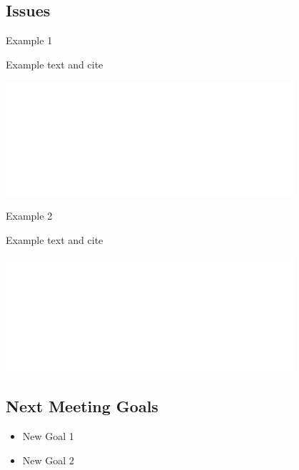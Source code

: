 \subsection{Issues}
\begin{frame}{Example 1}
	\begin{minipage}{0.5\textwidth}
		Example text and cite \cite{article}
	\end{minipage}%
	\colorbox{blue!20}{\begin{minipage}{0.5\textwidth}
			\includegraphics[width=0.8\textwidth]{_Example/Images/tud_white.pdf}   
	\end{minipage}}
\end{frame}

\begin{frame}{Example 2}
	\begin{minipage}{0.5\textwidth}
		Example text and cite \cite{article}
	\end{minipage}%
	\colorbox{red!20}{\begin{minipage}{0.5\textwidth}
			\includegraphics[width=0.8\textwidth]{_Example/Images/tud_white.pdf}   
	\end{minipage}}
\end{frame}



\subsection{Next Meeting Goals}
\begin{frame}{}
\centering
\begin{minipage}{0.6\textwidth}
		\begin{itemize}
        \centering
			\item New Goal 1
			\item New Goal 2
		\end{itemize}
	\end{minipage}
\end{frame}